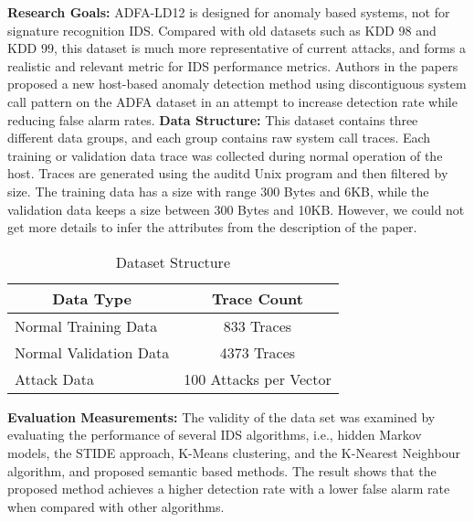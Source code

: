 \textbf{Research Goals:} ADFA-LD12 is designed for anomaly based systems, not for signature recognition IDS. Compared with old datasets such as KDD 98 and KDD 99, this dataset is much more representative of current attacks, and forms a realistic  and relevant metric for IDS performance metrics. Authors in the papers proposed a  new host-based anomaly detection method using discontiguous system call pattern on the ADFA dataset in an attempt to increase detection rate while reducing false alarm rates.\newline
\textbf{Data Structure:} This dataset contains three different data groups, and each group contains raw system call traces. Each training or validation data trace  was collected during normal operation of the host. Traces are generated using the auditd Unix program and then filtered by size. The training data has a size  with range 300 Bytes and 6KB, while the validation data keeps a size between 300 Bytes and 10KB. However, we could not get more details to infer the attributes from the description of the paper.\newline

\begin{table}[h]
\begin{tabular}{|l|c|}
\hline
\multicolumn{1}{|c|}{\textbf{Data Type}} & \textbf{Trace Count} \\ \hline
Normal Training Data & 833 Traces \\ \hline
Normal Validation Data & 4373 Traces \\ \hline
Attack Data & 100 Attacks per Vector \\ \hline
\end{tabular}
\caption{Dataset Structure}
\end{table}

\textbf{Evaluation Measurements:} The validity of the data set was examined by evaluating the performance of several IDS algorithms, i.e., hidden Markov models, the STIDE approach, K-Means clustering, and the K-Nearest Neighbour algorithm, and proposed semantic based methods. The result shows that the proposed method achieves a higher detection rate with a lower false alarm rate when compared with other algorithms.\newline


